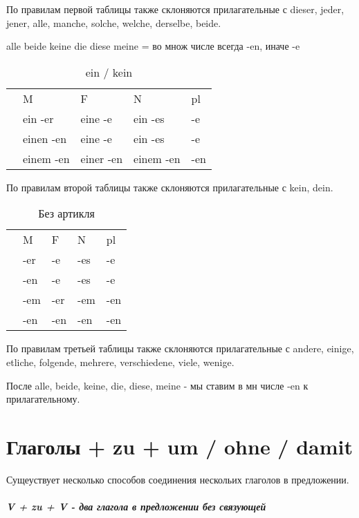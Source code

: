 \documentclass[12pt,a4paper]{report}
\newcommand{\nom}{ {\color{black}{\textbf{N}}} }
\newcommand{\akk}{ {\color{red}{\textbf{A}}} }
\newcommand{\dat}{ {\color{blue}{\textbf{D}}} }
\newcommand{\gen}{ {\color{userdarkgreen}{\textbf{G}}} }
\begin{document}
По правилам первой таблицы также склоняются прилагательные с dieser, jeder, jener, alle, manche, solche, welche, derselbe, beide.

alle beide keine die diese meine = во множ числе всегда -en, иначе -e

\begin{longtable}{ c l l l l }
\caption{ein / kein} \label{tab:long} \\
		& M 			& F 		& N 		& pl 	\\
\nom 	& ein -er 		& eine -e	& ein -es	& -e	\\
\akk 	& einen -en 	& eine -e	& ein -es	& -e	\\
\dat 	& einem -en 	& einer -en	& einem -en	& -en	\\
\end{longtable}

По правилам второй таблицы также склоняются прилагательные с kein, dein.

\begin{longtable}{ c l l l l }
\caption{Без артикля} \label{tab:long} \\
		& M 	& F 	& N 	& pl 	\\
\nom 	& -er 	& -e	& -es	& -e	\\
\akk 	& -en 	& -e	& -es	& -e	\\
\dat 	& -em 	& -er	& -em	& -en	\\
\gen 	& -en 	& -en	& -en	& -en	\\
\end{longtable}

По правилам третьей таблицы также склоняются прилагательные с andere, einige, etliche, folgende, mehrere, verschiedene, viele, wenige.

После alle, beide, keine, die, diese, meine - мы ставим в мн числе -en к прилагательному.


\newpage

\newpage

\newpage

\newpage

\newpage

\chapter{Глаголы + zu + um / ohne / damit}

Сущеуствует несколько способов соединения нескольих глаголов в предложении.

\paragraph{V + zu + V - два глагола в предложении без связующей}
\end{document}

